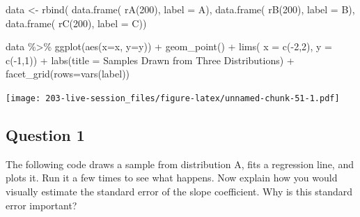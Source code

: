 \documentclass[
]{book}
\newenvironment{Shaded}{\begin{snugshade}}{\end{snugshade}}
\newcommand{\AttributeTok}[1]{\textcolor[rgb]{0.77,0.63,0.00}{#1}}
\newcommand{\DecValTok}[1]{\textcolor[rgb]{0.00,0.00,0.81}{#1}}
\newcommand{\FunctionTok}[1]{\textcolor[rgb]{0.00,0.00,0.00}{#1}}
\newcommand{\NormalTok}[1]{#1}
\newcommand{\OtherTok}[1]{\textcolor[rgb]{0.56,0.35,0.01}{#1}}
\newcommand{\SpecialCharTok}[1]{\textcolor[rgb]{0.00,0.00,0.00}{#1}}
\newcommand{\StringTok}[1]{\textcolor[rgb]{0.31,0.60,0.02}{#1}}
\theoremstyle{definition}
\theoremstyle{definition}
\theoremstyle{definition}
\theoremstyle{definition}
\theoremstyle{remark}
\begin{document}
\begin{Shaded}
\begin{Highlighting}[]
\NormalTok{data }\OtherTok{\textless{}{-}} \FunctionTok{rbind}\NormalTok{( }
  \FunctionTok{data.frame}\NormalTok{( }\FunctionTok{rA}\NormalTok{(}\DecValTok{200}\NormalTok{), }\AttributeTok{label =} \StringTok{\textquotesingle{}A\textquotesingle{}}\NormalTok{),}
  \FunctionTok{data.frame}\NormalTok{( }\FunctionTok{rB}\NormalTok{(}\DecValTok{200}\NormalTok{), }\AttributeTok{label =} \StringTok{\textquotesingle{}B\textquotesingle{}}\NormalTok{),}
  \FunctionTok{data.frame}\NormalTok{( }\FunctionTok{rC}\NormalTok{(}\DecValTok{200}\NormalTok{), }\AttributeTok{label =} \StringTok{\textquotesingle{}C\textquotesingle{}}\NormalTok{))}
\end{Highlighting}
\end{Shaded}

\begin{Shaded}
\begin{Highlighting}[]
\NormalTok{data }\SpecialCharTok{\%\textgreater{}\%} 
  \FunctionTok{ggplot}\NormalTok{(}\FunctionTok{aes}\NormalTok{(}\AttributeTok{x=}\NormalTok{x, }\AttributeTok{y=}\NormalTok{y)) }\SpecialCharTok{+} 
  \FunctionTok{geom\_point}\NormalTok{() }\SpecialCharTok{+} 
  \FunctionTok{lims}\NormalTok{(}
    \AttributeTok{x =} \FunctionTok{c}\NormalTok{(}\SpecialCharTok{{-}}\DecValTok{2}\NormalTok{,}\DecValTok{2}\NormalTok{), }
    \AttributeTok{y =} \FunctionTok{c}\NormalTok{(}\SpecialCharTok{{-}}\DecValTok{1}\NormalTok{,}\DecValTok{1}\NormalTok{)) }\SpecialCharTok{+} 
  \FunctionTok{labs}\NormalTok{(}\AttributeTok{title =} \StringTok{\textquotesingle{}Samples Drawn from Three Distributions\textquotesingle{}}\NormalTok{) }\SpecialCharTok{+} 
  \FunctionTok{facet\_grid}\NormalTok{(}\AttributeTok{rows=}\FunctionTok{vars}\NormalTok{(label))}
\end{Highlighting}
\end{Shaded}

\texttt{[image: 203-live-session\_files/figure-latex/unnamed-chunk-51-1.pdf]}

\hypertarget{question-1}{%
\subsection{Question 1}\label{question-1}}

The following code draws a sample from distribution A, fits a regression line, and plots it. Run it a few times to see what happens. Now explain how you would visually estimate the standard error of the slope coefficient. Why is this standard error important?
\end{document}
